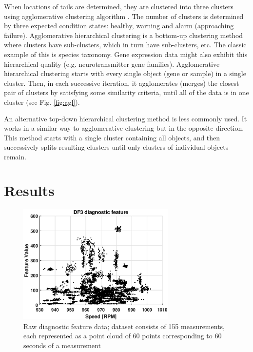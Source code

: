 \documentclass[10pt]{article}
\begin{document}
When locations of tails are determined, they are clustered into three clusters using agglomerative clustering algorithm \cite{kaufman2009finding,rokach2005clustering}. The number of clusters is determined by three expected condition states: healthy, warning and alarm (approaching failure). Agglomerative hierarchical clustering is a bottom-up clustering method where clusters have sub-clusters, which in turn have sub-clusters, etc. The classic example of this is species taxonomy. Gene expression data might also exhibit this hierarchical quality (e.g. neurotransmitter gene families). Agglomerative hierarchical clustering starts with every single object (gene or sample) in a single cluster. Then, in each successive iteration, it agglomerates (merges) the closest pair of clusters by satisfying some similarity criteria, until all of the data is in one cluster (see Fig. \ref{fig:agl}).


An alternative top-down hierarchical clustering method is less commonly used. It works in a similar way to agglomerative clustering but in the opposite direction. This method starts with a single cluster containing all objects, and then successively splits resulting clusters until only clusters of individual objects remain.

\section{Results}

\begin{figure}[h!]
\centering
\includegraphics[width=0.7\textwidth]{wykresy/df3}
\caption{Raw diagnostic feature data; dataset consists of 155 measurements, each represented as a point cloud of 60 points corresponding to 60 seconds of a measurement}
\label{fig:df3}
\vspace{-5pt}
\end{figure}
\end{document}
